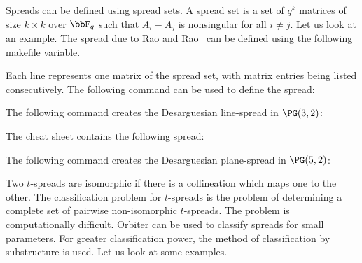 \bigskip

Spreads can be defined using spread sets. 
A spread set is a set of $q^k$ matrices of size $k \times k$ over $\bbF_q$ such that $A_i-A_j$ 
is nonsingular for all $i \neq j.$ 
Let us look at an example. 
The spread due to Rao and Rao~\cite{RaoRao1976} 
can be defined using the following makefile variable. 
{\tt

}
Each line represents one matrix of the spread set, with matrix entries being listed consecutively.
The following command can be used to define the spread:
{\tt

}



\bigskip


The following command creates the Desarguesian line-spread in $\PG(3,2)$: 
{\tt

}
The cheat sheet contains the following spread:\\
\begin{mdframed}[style=MyFrame]

\end{mdframed}

\bigskip

The following command creates the Desarguesian plane-spread in $\PG(5,2)$:
{\tt

}
\begin{mdframed}[style=MyFrame]

\end{mdframed}

\bigskip





Two $t$-spreads are isomorphic if there is a collineation which maps one to the other. 
The classification problem for $t$-spreads is the problem of determining a complete set of pairwise non-isomorphic 
$t$-spreads. The problem is computationally difficult. 
Orbiter can be used to classify spreads for small parameters. 
For greater classification power, the method of classification by substructure is used.
Let us look at some examples. 



